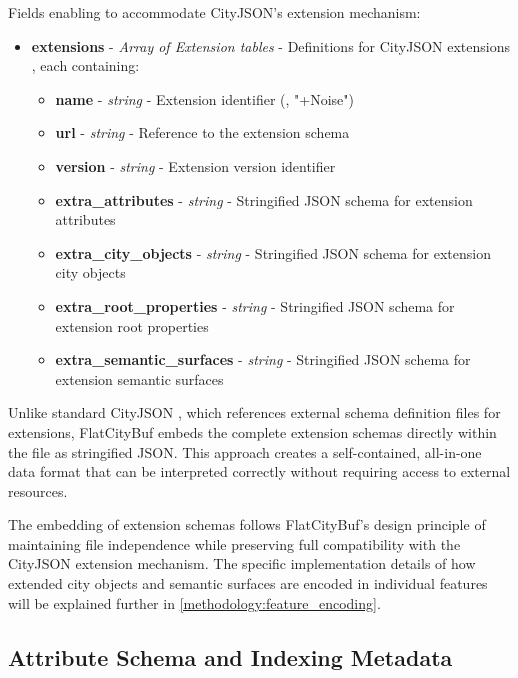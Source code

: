 Fields enabling to accommodate CityJSON's extension mechanism:

\begin{itemize}
  \item \textbf{extensions} - \textit{Array of Extension tables} - Definitions for CityJSON extensions \citep{cityjson_spec}, each containing:
    \begin{itemize}
      \item \textbf{name} - \textit{string} - Extension identifier (\eg, "+Noise")
      \item \textbf{url} - \textit{string} - Reference to the extension schema
      \item \textbf{version} - \textit{string} - Extension version identifier
      \item \textbf{extra\_attributes} - \textit{string} - Stringified JSON schema for extension attributes
      \item \textbf{extra\_city\_objects} - \textit{string} - Stringified JSON schema for extension city objects
      \item \textbf{extra\_root\_properties} - \textit{string} - Stringified JSON schema for extension root properties
      \item \textbf{extra\_semantic\_surfaces} - \textit{string} - Stringified JSON schema for extension semantic surfaces
    \end{itemize}
\end{itemize}

Unlike standard CityJSON \citep{cityjson_spec}, which references external schema definition files for extensions, FlatCityBuf embeds the complete extension schemas directly within the file as stringified JSON. This approach creates a self-contained, all-in-one data format that can be interpreted correctly without requiring access to external resources.

The embedding of extension schemas follows FlatCityBuf's design principle of maintaining file independence while preserving full compatibility with the CityJSON extension mechanism. The specific implementation details of how extended city objects and semantic surfaces are encoded in individual features will be explained further in \autoref{methodology:feature_encoding}.

\subsection{Attribute Schema and Indexing Metadata}
\label{methodology:header:schema_indexing}

